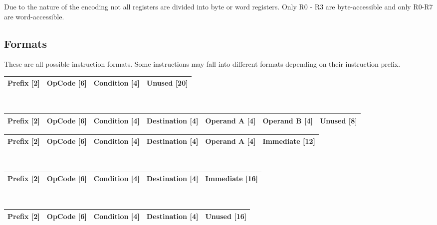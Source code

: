 Due to the nature of the encoding not all registers are divided into byte or word registers. Only R0 - R3 are byte-accessible and only R0-R7 are word-accessible. 

\newpage

\subsection{Formats}

These are all possible instruction formats. Some instructions may fall into different formats depending on their instruction prefix. 


\begin{tabular}{ | r | r | r | r |}
	\hline
	Prefix [2] & OpCode [6] & Condition [4] & Unused [20] \\
	\hline
\end{tabular} \\


\begin{tabular}{ | r | r | r | r | r | r | r | }
	\hline
	Prefix [2] & OpCode [6] & Condition [4] & Destination [4] & Operand A [4] & Operand B [4] & Unused [8] \\
	\hline
\end{tabular}


\begin{tabular}{ | r | r | r | r | r | r | }
	\hline
	Prefix [2] & OpCode [6] & Condition [4] & Destination [4] & Operand A [4] & Immediate [12] \\
	\hline
\end{tabular} \\


\begin{tabular}{ | r | r | r | r | r | }
	\hline
	Prefix [2] & OpCode [6] & Condition [4] & Destination [4] & Immediate [16] \\
	\hline
\end{tabular} \\


\begin{tabular}{ | r | r | r | r | r | }
	\hline
	Prefix [2] & OpCode [6] & Condition [4] & Destination [4] & Unused [16] \\
	\hline
\end{tabular} \\

